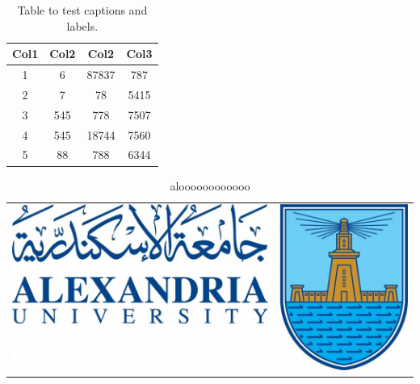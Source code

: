 \begin{table}[h!]
\begin{center}
\begin{tabular}{||c c c c||} 
 \hline
 Col1 & Col2 & Col2 & Col3 \\ [0.5ex] 
 \hline\hline
 1 & 6 & 87837 & 787 \\ 
 \hline
 2 & 7 & 78 & 5415 \\
 \hline
 3 & 545 & 778 & 7507 \\
 \hline
 4 & 545 & 18744 & 7560 \\
 \hline
 5 & 88 & 788 & 6344 \\ [1ex] 
 \hline
\end{tabular}
\end{center}
\caption{Table to test captions and labels.}
\label{table:1}
\end{table}
\begin{table}[h!]
\begin{center}
\begin{tabular}{|c|}

\includegraphics[width=\textwidth]{Images/ALEXU_1.jpg}

\end{tabular}
\end{center}
\caption{aloooooooooooo}
\label{table:1}
\end{table}
